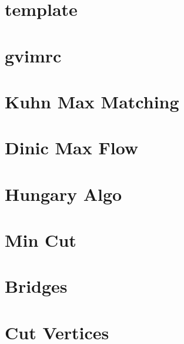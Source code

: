 \documentclass[10pt]{article}
\begin{document}
\section{template}

\section{gvimrc}

\section{Kuhn Max Matching}

\section{Dinic Max Flow}

\section{Hungary Algo}

\section{Min Cut}

\section{Bridges}

\section{Cut Vertices}

\end{document}
